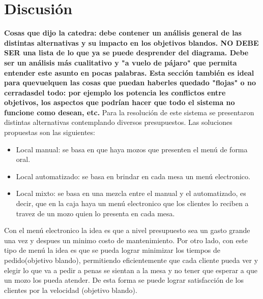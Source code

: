 \documentclass[a4paper,10pt]{article}
\begin{document}
\newpage
\section*{Discusi\'on}

\textbf{Cosas que dijo la catedra: debe contener un análisis general de las distintas alternativas y su impacto en los objetivos blandos. NO DEBE SER una lista de lo que ya se puede desprender del diagrama. Debe ser un análisis más cualitativo y "a vuelo de pájaro" que permita entender este asunto en pocas palabras. Esta sección también es ideal para quevuelquen las cosas que puedan haberles quedado "flojas" o no cerradasdel todo: por ejemplo los potencia les conflictos entre objetivos, los aspectos que podrían hacer que todo el sistema no funcione como desean, etc.}
Para la resoluci\'on de este sistema se presentaron distintas alternativas contemplando diversos presupuestos. Las soluciones propuestas son las siguientes:
\begin{itemize}
\item Local manual: se basa en que haya mozos que presenten el men\'u de forma oral.
\item Local automatizado: se basa en brindar en cada mesa un men\'u electronico.
\item Local mixto: se basa en una mezcla entre el manual y el automatizado, es decir, que en la caja haya un men\'u electronico que los clientes lo reciben a travez de un mozo quien lo presenta en cada mesa.
\end{itemize}


Con el men\'u electronico la idea es que a nivel presupuesto sea un gasto grande una vez y despues un minimo costo de mantenimiento. Por otro lado, con este tipo de men\'u la idea es que se pueda lograr minimizar los tiempos de pedido(objetivo blando), permitiendo eficientemente que cada cliente pueda ver y elegir lo que va a pedir a penas se sientan a la mesa y no tener que esperar a que un mozo los pueda atender. De esta forma se puede lograr satisfacci\'on de los clientes por la velocidad (objetivo blando). 
\end{document}
